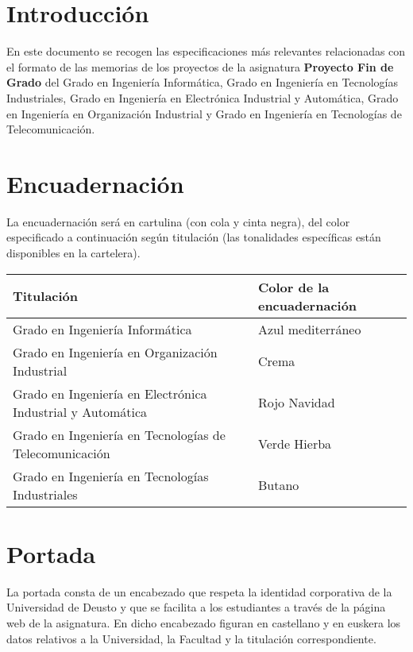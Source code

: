 \section{Introducci\'on}

En este documento se recogen las especificaciones más relevantes relacionadas con el formato de
las memorias de los proyectos de la asignatura \textbf{Proyecto Fin de Grado} del Grado en Ingeniería
Informática, Grado en Ingeniería en Tecnologías Industriales, Grado en Ingeniería en Electrónica
Industrial y Automática, Grado en Ingeniería en Organización Industrial y Grado en Ingeniería
en Tecnologías de Telecomunicación.

\section{Encuadernaci\'on}

La encuadernación será en cartulina (con cola y cinta negra), del color especificado a continuación
según titulación (las tonalidades específicas están disponibles en la cartelera).

\begin{center}
  \begin{tabular}{ll}
    \toprule
      \textbf{Titulaci\'on} & \textbf{Color de la encuadernación}\\
    \midrule
      Grado en Ingeniería Informática                             &  Azul mediterráneo \\
      Grado en Ingeniería en Organización Industrial              &  Crema             \\
      Grado en Ingeniería en Electrónica Industrial y Automática  &  Rojo Navidad      \\
      Grado en Ingeniería en Tecnologías de Telecomunicación      &  Verde Hierba      \\
      Grado en Ingeniería en Tecnologías Industriales             &  Butano            \\
    \bottomrule
  \end{tabular}
\end{center}

\section{Portada}

La portada consta de un encabezado que respeta la identidad corporativa de la Universidad de
Deusto y que se facilita a los estudiantes a través de la página web de la asignatura. En dicho
encabezado figuran en castellano y en euskera los datos relativos a la Universidad, la Facultad y la
titulación correspondiente.

